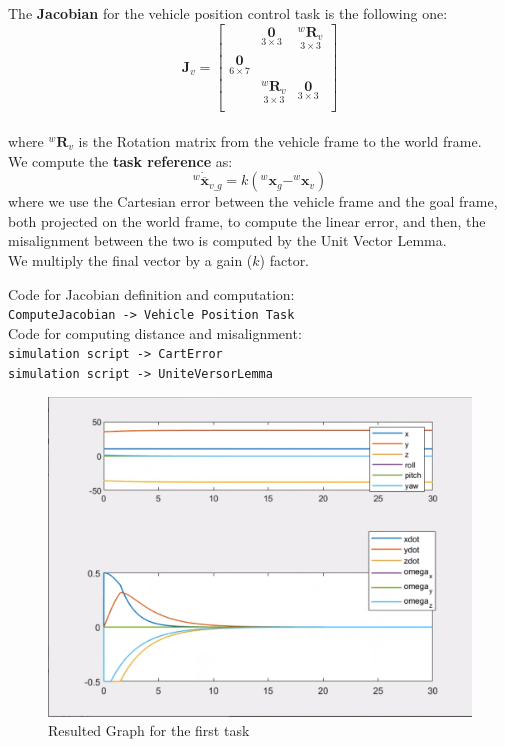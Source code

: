 \documentclass{article}
\begin{document}
The \textbf{Jacobian} for the vehicle position control task is the following one:
\begin{equation}
    \boldsymbol{J}_v = \begin{bmatrix}
 & \underset{3\times3}{\boldsymbol{0}} & \underset{3\times3}{^{w}\boldsymbol{R}_{v}} \\
\underset{6\times7}{\boldsymbol{0}} \\
& \underset{ 3\times 3}{^{w}\boldsymbol{R}_{v}} & \underset{3\times 3}{\boldsymbol{0}} \\
\end{bmatrix}
\end{equation}
\\ 
where ${^{w}\boldsymbol{R}_{v}}$ is the Rotation matrix from the vehicle frame to the world frame.
\\
We compute the \textbf{task reference} as:
\begin{equation}
    ^{w}\dot{\overline{\boldsymbol{x}}}_{v\_g}=k\left(^{w} \boldsymbol{x}_{g}-^{w} \boldsymbol{x}_{v}\right)
\end{equation}
where we use the Cartesian error between the vehicle frame and the goal frame, both projected on the world frame, to compute the linear error, and then, the misalignment between the two is computed by the Unit Vector Lemma.\\
We multiply the final vector by a gain ($k$) factor.

\colorbox{mygray}{\parbox{0.9\textwidth}{
Code for Jacobian definition and computation: \\
\texttt{ComputeJacobian -> Vehicle Position Task}\\
Code for computing distance and misalignment: \\
\texttt{simulation script -> CartError} \\
\texttt{simulation script -> UniteVersorLemma}
}}

\begin{figure}[!h]
    \centering
    \includegraphics[scale=0.5]{111_ppdot.png}
    \caption{Resulted Graph for the first task}
    \label{graph_1_1}
\end{figure}
\end{document}
